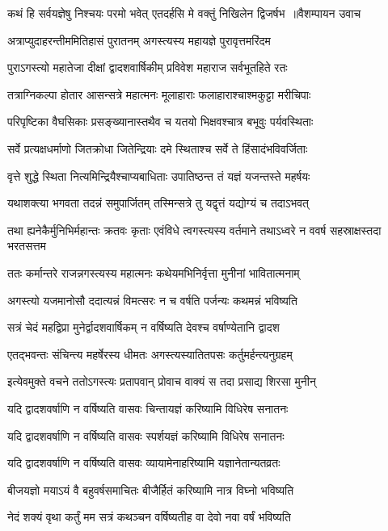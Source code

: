 \threelineshloka
{कथं हि सर्वयज्ञेषु निश्चयः परमो भवेत्}
{एतदर्हसि मे वक्तुं निखिलेन द्विजर्षभ ॥वैशम्पायन उवाच}
{}


\twolineshloka
{अत्राप्युदाहरन्तीममितिहासं पुरातनम्}
{अगस्त्यस्य महायज्ञे पुरावृत्तमरिंदम}


\twolineshloka
{पुराऽगस्त्यो महातेजा दीक्षां द्वादशवार्षिकीम्}
{प्रविवेश महाराज सर्वभूतहिते रतः}


\twolineshloka
{तत्राग्निकल्पा होतार आसन्सत्रे महात्मनः}
{मूलाहाराः फलाहाराश्चाश्मकुट्टा मरीचिपाः}


\twolineshloka
{परिपृष्टिका वैघसिकाः प्रसङ्ख्यानास्तथैव च}
{यतयो भिक्षवश्चात्र बभूवुः पर्यवस्थिताः}


\twolineshloka
{सर्वे प्रत्यक्षधर्माणो जितक्रोधा जितेन्द्रियाः}
{दमे स्थिताश्च सर्वे ते हिंसादंभविवर्जिताः}


\twolineshloka
{वृत्ते शुद्धे स्थिता नित्यमिन्द्रियैश्चाप्यबाधिताः}
{उपातिष्ठन्त तं यज्ञं यजन्तस्ते महर्षयः}


\twolineshloka
{यथाशक्त्या भगवता तदन्नं समुपार्जितम्}
{तस्मिन्सत्रे तु यद्वृत्तं यद्योग्यं च तदाऽभवत्}


\threelineshloka
{तथा ह्यनेकैर्मुनिभिर्महान्तः क्रतवः कृताः}
{एवंविधे त्वगस्त्यस्य वर्तमाने तथाऽध्वरे}
{न ववर्ष सहस्राक्षस्तदा भरतसत्तम}


\twolineshloka
{ततः कर्मान्तरे राजन्नगस्त्यस्य महात्मनः}
{कथेयमभिनिर्वृत्ता मुनीनां भावितात्मनाम्}


\twolineshloka
{अगस्त्यो यजमानोसौ ददात्यन्नं विमत्सरः}
{न च वर्षति पर्जन्यः कथमन्नं भविष्यति}


\twolineshloka
{सत्रं चेदं महद्विप्रा मुनेर्द्वादशवार्षिकम्}
{न वर्षिष्यति देवश्च वर्षाण्येतानि द्वादश}


\twolineshloka
{एतद्भवन्तः संचिन्त्य महर्षेरस्य धीमतः}
{अगस्त्यस्यातितपसः कर्तुमर्हन्त्यनुग्रहम्}


\twolineshloka
{इत्येवमुक्ते वचने ततोऽगस्त्यः प्रतापवान्}
{प्रोवाच वाक्यं स तदा प्रसाद्य शिरसा मुनीन्}


\twolineshloka
{यदि द्वादशवर्षाणि न वर्षिष्यति वासवः}
{चिन्तायज्ञं करिष्यामि विधिरेष सनातनः}


\twolineshloka
{यदि द्वादशवर्षाणि न वर्षिष्यति वासवः}
{स्पर्शयज्ञं करिष्यामि विधिरेष सनातनः}


\twolineshloka
{यदि द्वादशवर्षाणि न वर्षिष्यति वासवः}
{व्यायामेनाहरिष्यामि यज्ञानेतान्यतव्रतः}


\twolineshloka
{बीजयज्ञो मयाऽयं वै बहुवर्षसमाचितः}
{बीजैर्हितं करिष्यामि नात्र विघ्नो भविष्यति}


\twolineshloka
{नेदं शक्यं वृथा कर्तुं मम सत्रं कथञ्चन}
{वर्षिष्यतीह वा देवो नवा वर्षं भविष्यति}


